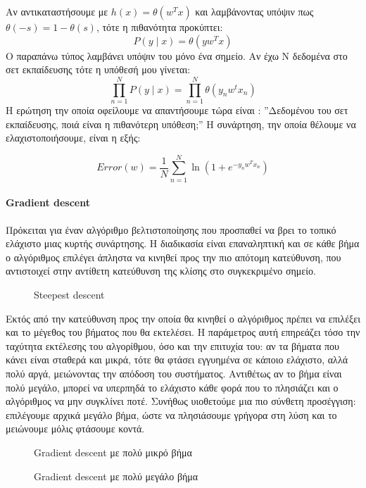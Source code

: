 Αν αντικαταστήσουμε με $h(x)=\theta(w^T x)$ και λαμβάνοντας υπόψιν πως $\theta(-s)= 1 - \theta(s)$, τότε η πιθανότητα  προκύπτει:
$$P(y \mid x)= \theta(y w^T x)$$
Ο παραπάνω τύπος λαμβάνει υπόψιν του μόνο ένα σημείο. Αν έχω N δεδομένα στο σετ εκπαίδευσης τότε η υπόθεσή μου γίνεται:
$$\prod_{n=1}^{N} P(y \mid x)= \prod_{n=1}^{N} \theta (y_n w^t x_n)$$
Η ερώτηση την οποία οφείλουμε να απαντήσουμε τώρα είναι : ”Δεδομένου του σετ εκπαίδευσης, ποιά είναι η πιθανότερη υπόθεση;” Η συνάρτηση, την οποία θέλουμε να ελαχιστοποιήσουμε, είναι η εξής:

$$Error(w)= \frac{1}{N} \sum_{n=1}^{N} \ln (1 + e^{- y_n w^T x_n} )$$

\paragraph{Gradient descent} Πρόκειται για έναν αλγόριθμο βελτιστοποίησης που προσπαθεί να βρει το τοπικό ελάχιστο μιας κυρτής συνάρτησης. Η διαδικασία είναι επαναληπτική και σε κάθε βήμα ο αλγόριθμος επιλέγει άπληστα να κινηθεί προς την πιο απότομη κατεύθυνση, που αντιστοιχεί στην αντίθετη κατεύθυνση της κλίσης στο συγκεκριμένο σημείο.
\begin{figure}[H]
	\centering			
	\caption[Steepest descent]{Steepest descent}
\end{figure}
Εκτός από την κατεύθυνση προς την οποία θα κινηθεί ο αλγόριθμος πρέπει να επιλέξει και το μέγεθος του βήματος που θα εκτελέσει. Η παράμετρος αυτή επηρεάζει τόσο την ταχύτητα εκτέλεσης του αλγορίθμου, όσο και την επιτυχία του: αν τα βήματα που κάνει είναι σταθερά και μικρά, τότε θα φτάσει εγγυημένα σε κάποιο ελάχιστο, αλλά πολύ αργά, μειώνοντας την απόδοση του συστήματος. Αντιθέτως αν το βήμα είναι πολύ μεγάλο, μπορεί να υπερπηδά το ελάχιστο κάθε φορά που το πλησιάζει και ο αλγόριθμος να μην συγκλίνει ποτέ. Συνήθως υιοθετούμε μια πιο σύνθετη προσέγγιση: επιλέγουμε αρχικά μεγάλο βήμα, ώστε να πλησιάσουμε γρήγορα στη λύση και το μειώνουμε μόλις φτάσουμε κοντά.
\begin{figure}[H]
	\centering
	\begin{minipage}{.5\textwidth}
		\centering
		\caption[Gradient descent με πολύ μικρό βήμα]{Gradient descent με πολύ μικρό βήμα}
		
	\end{minipage}%
	\begin{minipage}{0.5\textwidth}
		\centering
		\caption[Gradient descent με πολύ μεγάλο βήμα]{Gradient descent με πολύ μεγάλο βήμα}
		
	\end{minipage}
\end{figure}